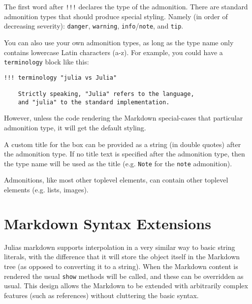 The first word after \texttt{!!!} declares the type of the admonition. There are standard admonition types that should produce special styling. Namely (in order of decreasing severity): \texttt{danger}, \texttt{warning}, \texttt{info}/\texttt{note}, and \texttt{tip}.



You can also use your own admonition types, as long as the type name only contains lowercase Latin characters (a-z). For example, you could have a \texttt{terminology} block like this:




\begin{lstlisting}
!!! terminology "julia vs Julia"

    Strictly speaking, "Julia" refers to the language,
    and "julia" to the standard implementation.
\end{lstlisting}



However, unless the code rendering the Markdown special-cases that particular admonition type, it will get the default styling.



A custom title for the box can be provided as a string (in double quotes) after the admonition type. If no title text is specified after the admonition type, then the type name will be used as the title (e.g. \texttt{{\textquotedbl}Note{\textquotedbl}} for the \texttt{note} admonition).



Admonitions, like most other toplevel elements, can contain other toplevel elements (e.g. lists, images).



\hypertarget{10627994621615977524}{}


\section{Markdown Syntax Extensions}



Julia{\textquotesingle}s markdown supports interpolation in a very similar way to basic string literals, with the difference that it will store the object itself in the Markdown tree (as opposed to converting it to a string). When the Markdown content is rendered the usual \texttt{show} methods will be called, and these can be overridden as usual. This design allows the Markdown to be extended with arbitrarily complex features (such as references) without cluttering the basic syntax.



